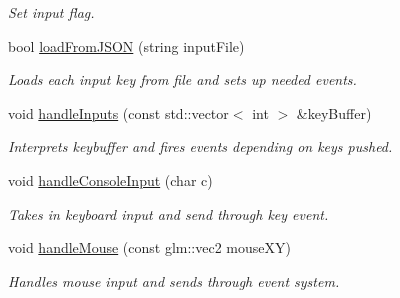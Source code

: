 \begin{DoxyCompactItemize}
\begin{DoxyCompactList}\small\item\em Set input flag. \end{DoxyCompactList}\item 
\hypertarget{class_input_handler_aeb71183f7023decf10d19b949480a574}{bool \hyperlink{class_input_handler_aeb71183f7023decf10d19b949480a574}{load\+From\+J\+S\+O\+N} (string input\+File)}\label{class_input_handler_aeb71183f7023decf10d19b949480a574}

\begin{DoxyCompactList}\small\item\em Loads each input key from file and sets up needed events. \end{DoxyCompactList}\item 
\hypertarget{class_input_handler_ab3b5fe17099a9bffe0a1dcedf4a439ed}{void \hyperlink{class_input_handler_ab3b5fe17099a9bffe0a1dcedf4a439ed}{handle\+Inputs} (const std\+::vector$<$ int $>$ \&key\+Buffer)}\label{class_input_handler_ab3b5fe17099a9bffe0a1dcedf4a439ed}

\begin{DoxyCompactList}\small\item\em Interprets keybuffer and fires events depending on keys pushed. \end{DoxyCompactList}\item 
\hypertarget{class_input_handler_a2ae198e972137bde4f2fe5b7c899a2e4}{void \hyperlink{class_input_handler_a2ae198e972137bde4f2fe5b7c899a2e4}{handle\+Console\+Input} (char c)}\label{class_input_handler_a2ae198e972137bde4f2fe5b7c899a2e4}

\begin{DoxyCompactList}\small\item\em Takes in keyboard input and send through key event. \end{DoxyCompactList}\item 
\hypertarget{class_input_handler_a0ebc7e1f1c6f9f53e8b7a97df8fb7233}{void \hyperlink{class_input_handler_a0ebc7e1f1c6f9f53e8b7a97df8fb7233}{handle\+Mouse} (const glm\+::vec2 mouse\+X\+Y)}\label{class_input_handler_a0ebc7e1f1c6f9f53e8b7a97df8fb7233}

\begin{DoxyCompactList}\small\item\em Handles mouse input and sends through event system. \end{DoxyCompactList}\end{DoxyCompactItemize}
